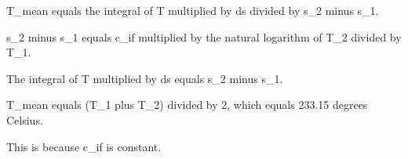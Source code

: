 T_mean equals the integral of T multiplied by ds divided by s_2 minus s_1.  

s_2 minus s_1 equals c_if multiplied by the natural logarithm of T_2 divided by T_1.  

The integral of T multiplied by ds equals s_2 minus s_1.  

T_mean equals (T_1 plus T_2) divided by 2, which equals 233.15 degrees Celsius.  

This is because c_if is constant.